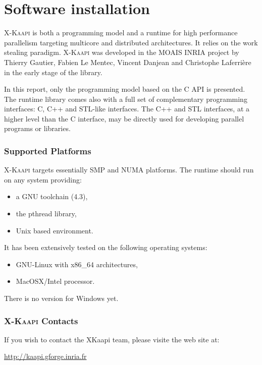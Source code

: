 \documentclass[a4paper, 11pt]{article}
\newcommand{\kaapi}{\textsc{X-Kaapi}\xspace}
\begin{document}
\makeRT %

\tableofcontents
{}

\newpage
\section{Software installation}\label{sec:userinstall}

\kaapi is both a programming model and a runtime for high performance parallelism targeting multicore and distributed architectures. 
It relies on the work stealing paradigm.
\kaapi was developed in the MOAIS INRIA project by Thierry Gautier, Fabien Le Mentec, Vincent Danjean and Christophe Laferri\`{e}re in the early stage of the library.

In this report, only the programming model based on the C API is presented.
The runtime library comes also with a full set of complementary programming interfaces: C, C++ and STL-like interfaces. The C++ and STL interfaces, at a higher level than the C interface, may be directly used for developing parallel programs or libraries.

\subsubsection*{Supported Platforms}
\kaapi targets essentially SMP and NUMA platforms. The runtime should run
on any system providing:
\begin{itemize}
\item a GNU toolchain (4.3),
\item the pthread library,
\item Unix based environment.
\end{itemize}
It has been extensively tested on the following operating systems:
\begin{itemize}
\item GNU-Linux with x86\_64 architectures,
\item MacOSX/Intel processor.
\end{itemize}

There is no version for Windows yet.

\subsubsection*{\kaapi Contacts}
If you wish to contact the XKaapi team, please visite the web site at:
\begin{center}
\url{http://kaapi.gforge.inria.fr}
\end{center}
\end{document}
